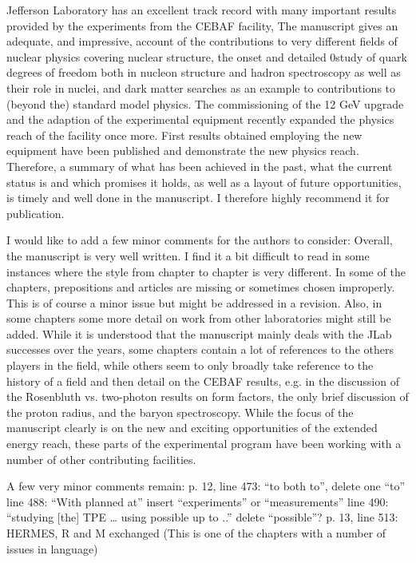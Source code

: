 \documentclass[10pt,aps,prl,amsmath,amssymb,superscriptaddress,nofootinbib,showpacs,preprintnumbers,amsfonts, notitlepage]{revtex4-2}
\begin{document}
Jefferson Laboratory has an excellent track record with many important results provided by the experiments from the CEBAF facility, The manuscript gives an adequate, and impressive, account of the contributions to very different fields of nuclear physics covering nuclear structure, the onset and detailed 0study of quark degrees of freedom both in nucleon structure and hadron spectroscopy as well as their role in nuclei, and dark matter searches as an example to contributions to (beyond the) standard model physics. The commissioning of the 12 GeV upgrade and the adaption of the experimental equipment recently expanded the physics reach of the facility once more. First results obtained employing the new equipment have been published and demonstrate the new physics reach. Therefore, a summary of what has been achieved in the past, what the current status is and which promises it holds, as well as a layout of future opportunities, is timely and well done in the manuscript. I therefore highly recommend it for publication.

I would like to add a few minor comments for the authors to consider:
Overall, the manuscript is very well written. I find it a bit  difficult to read in some instances where the style from chapter to chapter is very different. In some of the chapters, prepositions and articles are missing or sometimes chosen improperly. This is of course a minor issue but might be addressed in a revision.
Also, in some chapters some more detail on work from other laboratories might still be added. While it is understood that the manuscript mainly deals with the JLab successes over the years, some chapters contain a lot of references to the others players in the field, while others seem to only broadly take reference to the history of a field and then detail on the CEBAF results, e.g. in the discussion of the Rosenbluth vs. two-photon results on form factors, the only brief discussion of the proton radius, and the baryon spectroscopy. While the focus of the manuscript clearly is on the new and exciting opportunities of the extended energy reach, these parts of the experimental program have been working with a number of other contributing facilities.

A few very minor comments remain:
p. 12, line 473: “to both to”, delete one “to”
line 488: “With planned at” insert “experiments” or “measurements”
line 490: “studying [the] TPE … using possible up to ..” delete “possible”?
p. 13, line 513: HERMES, R and M exchanged
(This is one of the chapters with a number of issues in language)
\end{document}
